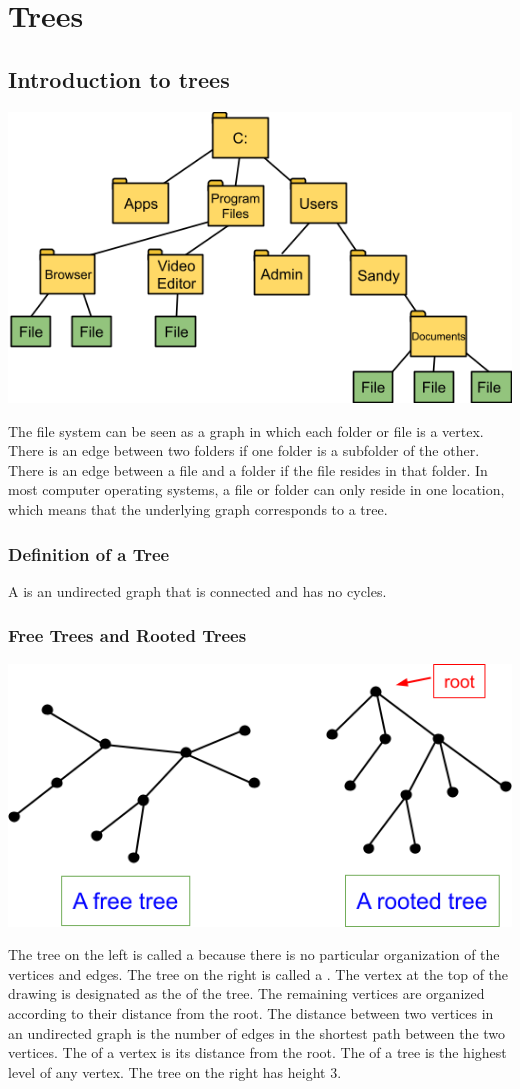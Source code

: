\section{Trees}
\subsection{Introduction to trees}
\begin{center}
  \includegraphics[width=0.6\linewidth]{resources/diagram of a file system.png}
\end{center}
The file system can be seen as a graph in which each folder or file is a vertex. There is an edge between two folders if one folder is a subfolder of the other. There is an edge between a file and a folder if the file resides in that folder. In most computer operating systems, a file or folder can only reside in one location, which means that the underlying graph corresponds to a tree.

\subsubsection*{Definition of a Tree}
A  is an undirected graph that is connected and has no cycles.

\subsubsection*{Free Trees and Rooted Trees}
\begin{center}
  \includegraphics[width=0.5\linewidth]{resources/free and rooted trees.png}
\end{center}
The tree on the left is called a  because there is no particular organization of the vertices and edges. The tree on the right is called a . The vertex at the top of the drawing is designated as the  of the tree. The remaining vertices are organized according to their distance from the root. The distance between two vertices in an undirected graph is the number of edges in the shortest path between the two vertices. The  of a vertex is its distance from the root. The  of a tree is the highest level of any vertex. The tree on the right has height 3.

